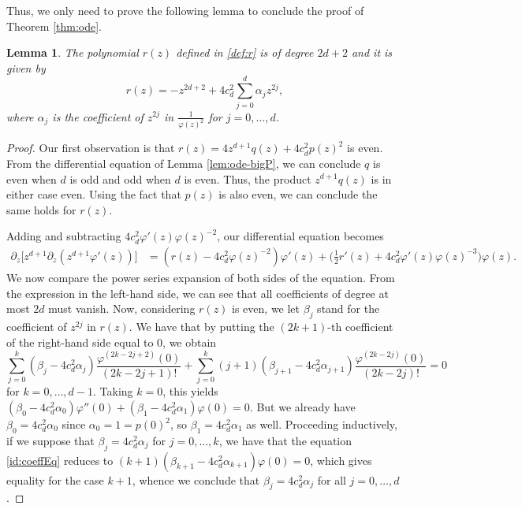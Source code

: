 \documentclass[a4paper,reqno,12pt]{amsart}
\newtheorem{lemma}[theorem]{Lemma}
\newcommand{\p}{\varphi}
\begin{document}
Thus, we only need to prove the following lemma to conclude the proof of Theorem \ref{thm:ode}.
\begin{lemma}\label{lem:r_poly}
    The polynomial $r(z)$ defined in \eqref{def:r} is of degree $2d + 2$ and it is given by
\begin{equation*}
    r(z) =  - z^{2d+2} + 4 c_d^2 \sum_{j = 0}^{d } \alpha_{j} z^{2j},
\end{equation*}
where $\alpha_j$ is the coefficient of $z^{2j}$ in $\frac{1}{\p(z)^2}$ for  $j = 0, \ldots, d$.
\end{lemma}
\begin{proof}
Our first observation is that $r(z) = 4z^{d+1}q(z)+4c_d^2p(z)^2$ is even. From the differential equation of Lemma \ref{lem:ode-bigP}, we can conclude $q$ is even when $d$ is odd and odd when $d$ is even. Thus, the product $z^{d+1} q(z)$ is in either case even. Using the fact that $p(z)$ is also even, we can conclude the same holds for $r(z)$. 

Adding and subtracting $4 c_d^2\p'(z)\p(z)^{-2}$, our differential equation becomes
\begin{align*}
    \partial_z\big[z^{d+1}\partial_z(z^{d+1}\p'(z))\big]
    &= (r(z) -4c_d^2\p(z)^{-2})\p'(z) + \bigg(\frac{1}{2}r'(z) +  4 c_d^2 \p'(z) \p(z)^{-3}\bigg) \p(z).
\end{align*}
We now compare the power series expansion of both sides of the equation. From the expression in the left-hand side, we can see that all coefficients of degree at most $2d$ must vanish. Now, considering $r(z) $ is even, we let $\beta_j$ stand for the coefficient of $z^{2j}$ in $r(z)$. We have that by putting the $(2k+1)$-th coefficient of the right-hand side equal to 0, we obtain
\begin{equation}\label{id:coeffEq}
    \sum_{j = 0}^{k} (\beta_j - 4c_d^2\alpha_j)  \frac{\p^{(2k -2j +2)}(0)}{(2k -2j +1)!} +  \sum_{j = 0}^{k} (j+1)(\beta_{j +1} -4c_d^2\alpha_{j+1})\frac{\p^{(2k-2j)}(0)}{(2k -2j)!} = 0 
\end{equation}
for $k =0, \ldots, d -1$. Taking $k = 0$, this yields $(\beta_0 -4 c_d^2\alpha_0)\p''(0) +  (\beta_1 - 4 c_d^2\alpha_1)\p(0) = 0$. But we already have $\beta_0 = 4c_d^2\alpha_0$ since $\alpha_0 = 1= p(0)^2 $, so $\beta_1 = 4 c_d^ 2\alpha_1$ as well. Proceeding inductively, if we suppose that $\beta_j = 4 c_d^2 \alpha_j$ for $j = 0, \ldots, k$, we have that the equation \eqref{id:coeffEq} reduces to $(k+1)(\beta_{k+1} - 4 c_d^2\alpha_{k+1}) \p(0) = 0$, which gives equality for the case $k+1$, whence we conclude that $\beta_j = 4 c_d^2 \alpha_j$ for all $j = 0, \ldots, d$. 


\end{proof}
\end{document}
